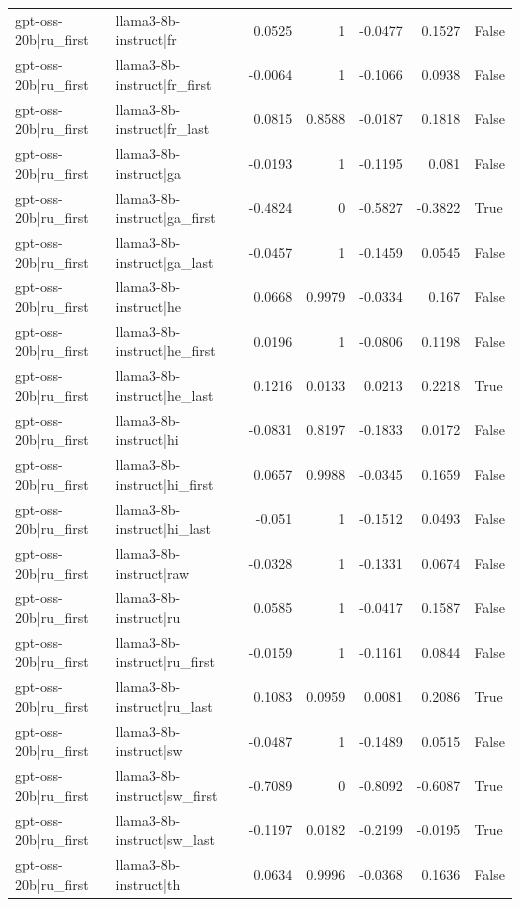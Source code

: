 \begin{table}
\begin{tabular}{l l r r r r l}
gpt-oss-20b|ru_first & llama3-8b-instruct|fr & 0.0525 & 1 & -0.0477 & 0.1527 & False \\
gpt-oss-20b|ru_first & llama3-8b-instruct|fr_first & -0.0064 & 1 & -0.1066 & 0.0938 & False \\
gpt-oss-20b|ru_first & llama3-8b-instruct|fr_last & 0.0815 & 0.8588 & -0.0187 & 0.1818 & False \\
gpt-oss-20b|ru_first & llama3-8b-instruct|ga & -0.0193 & 1 & -0.1195 & 0.081 & False \\
gpt-oss-20b|ru_first & llama3-8b-instruct|ga_first & -0.4824 & 0 & -0.5827 & -0.3822 & True \\
gpt-oss-20b|ru_first & llama3-8b-instruct|ga_last & -0.0457 & 1 & -0.1459 & 0.0545 & False \\
gpt-oss-20b|ru_first & llama3-8b-instruct|he & 0.0668 & 0.9979 & -0.0334 & 0.167 & False \\
gpt-oss-20b|ru_first & llama3-8b-instruct|he_first & 0.0196 & 1 & -0.0806 & 0.1198 & False \\
gpt-oss-20b|ru_first & llama3-8b-instruct|he_last & 0.1216 & 0.0133 & 0.0213 & 0.2218 & True \\
gpt-oss-20b|ru_first & llama3-8b-instruct|hi & -0.0831 & 0.8197 & -0.1833 & 0.0172 & False \\
gpt-oss-20b|ru_first & llama3-8b-instruct|hi_first & 0.0657 & 0.9988 & -0.0345 & 0.1659 & False \\
gpt-oss-20b|ru_first & llama3-8b-instruct|hi_last & -0.051 & 1 & -0.1512 & 0.0493 & False \\
gpt-oss-20b|ru_first & llama3-8b-instruct|raw & -0.0328 & 1 & -0.1331 & 0.0674 & False \\
gpt-oss-20b|ru_first & llama3-8b-instruct|ru & 0.0585 & 1 & -0.0417 & 0.1587 & False \\
gpt-oss-20b|ru_first & llama3-8b-instruct|ru_first & -0.0159 & 1 & -0.1161 & 0.0844 & False \\
gpt-oss-20b|ru_first & llama3-8b-instruct|ru_last & 0.1083 & 0.0959 & 0.0081 & 0.2086 & True \\
gpt-oss-20b|ru_first & llama3-8b-instruct|sw & -0.0487 & 1 & -0.1489 & 0.0515 & False \\
gpt-oss-20b|ru_first & llama3-8b-instruct|sw_first & -0.7089 & 0 & -0.8092 & -0.6087 & True \\
gpt-oss-20b|ru_first & llama3-8b-instruct|sw_last & -0.1197 & 0.0182 & -0.2199 & -0.0195 & True \\
gpt-oss-20b|ru_first & llama3-8b-instruct|th & 0.0634 & 0.9996 & -0.0368 & 0.1636 & False \\

\end{tabular}
\end{table}
